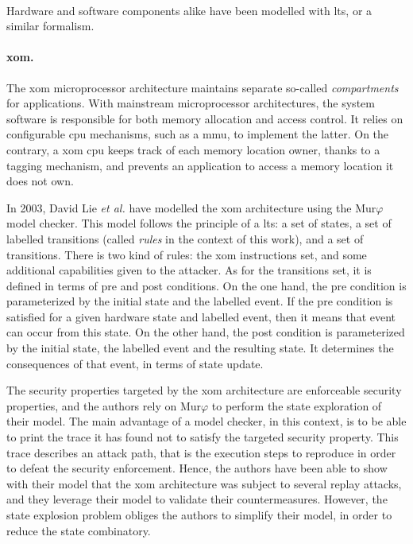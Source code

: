 \paragraph{}
%
Hardware and software components alike have been modelled with \ac{lts}, or a
similar formalism.

\paragraph{\ac{xom}.}
%
The \ac{xom} microprocessor architecture maintains separate so-called
\emph{compartments} for applications.
%
With mainstream microprocessor architectures, the system software is responsible
for both memory allocation and access control.
%
It relies on configurable \ac{cpu} mechanisms, such as a \ac{mmu}, to implement
the latter.
%
On the contrary, a \ac{xom} \ac{cpu} keeps track of each memory location owner,
thanks to a tagging mechanism, and prevents an application to access a memory
location it does not own.

In 2003, David Lie \emph{et al.} have modelled the \ac{xom} architecture using
the Mur$\varphi$ model checker.
%
This model follows the principle of a \ac{lts}: a set of states, a set of
labelled transitions (called \emph{rules} in the context of this work), and a
set of transitions.
%
There is two kind of rules: the \ac{xom} instructions set, and some additional
capabilities given to the attacker.
%
As for the transitions set, it is defined in terms of pre and post conditions.
%
On the one hand, the pre condition is parameterized by the initial state and the
labelled event.
%
If the pre condition is satisfied for a given hardware state and labelled event,
then it means that event can occur from this state.
%
On the other hand, the post condition is parameterized by the initial state, the
labelled event and the resulting state.
%
It determines the consequences of that event, in terms of state update.

The security properties targeted by the \ac{xom} architecture are enforceable
security properties, and the authors rely on Mur$\varphi$ to perform the state
exploration of their model.
%
The main advantage of a model checker, in this context, is to be able to print
the trace it has found not to satisfy the targeted security property.
%
This trace describes an attack path, that is the execution steps to reproduce in
order to defeat the security enforcement.
%
Hence, the authors have been able to show with their model that the \ac{xom}
architecture was subject to several replay attacks, and they leverage their
model to validate their countermeasures.
%
However, the state explosion problem obliges the authors to simplify their
model, in order to reduce the state combinatory.

